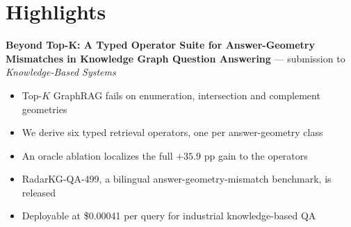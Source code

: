 \documentclass{article}
\begin{document}
\section*{Highlights}
\textbf{Beyond Top-K: A Typed Operator Suite for Answer-Geometry Mismatches in Knowledge Graph Question Answering} --- submission to \emph{Knowledge-Based Systems}\\[4pt]
\begin{itemize}[leftmargin=1.2em,nosep]
\item Top-$K$ GraphRAG fails on enumeration, intersection and complement geometries
\item We derive six typed retrieval operators, one per answer-geometry class
\item An oracle ablation localizes the full $+35.9$ pp gain to the operators
\item RadarKG-QA-499, a bilingual answer-geometry-mismatch benchmark, is released
\item Deployable at \$0.00041 per query for industrial knowledge-based QA
\end{itemize}
\end{document}
